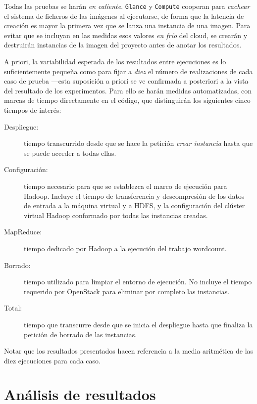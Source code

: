 Todas las pruebas se har\'an \emph{en caliente}. \texttt{Glance} y \texttt{Compute} cooperan para \emph{cachear} el sistema de ficheros de las im\'agenes al ejecutarse, de forma que la latencia de creaci\'on es mayor la primera vez que se lanza una instancia de una imagen. Para evitar que se incluyan en las medidas esos valores \emph{en fr\'io} del cloud, se crear\'an y destruir\'an instancias de la imagen del proyecto antes de anotar los resultados. \newline

A priori, la variabilidad esperada de los resultados entre ejecuciones es lo suficientemente peque\~na como para fijar a \emph{diez} el n\'umero de realizaciones de cada caso de prueba ---esta suposici\'on a priori se ve confirmada a posteriori a la vista del resultado de los experimentos. Para ello se har\'an medidas auto\-ma\-ti\-za\-das, con marcas de tiempo directamente en el c\'odigo, que distinguir\'an los siguientes cinco tiempos de inter\'es:

\begin{description}
    \item[Despliegue:] tiempo transcurrido desde que se hace la petici\'on \emph{crear ins\-tan\-cia} hasta que se puede acceder a todas ellas.
  \item[Configuraci\'on:] tiempo necesario para que se establezca el marco de ejecuci\'on para Hadoop. Incluye el tiempo de transferencia y descompresi\'on de los datos de entrada a la m\'aquina virtual y a HDFS, y la configuraci\'on del cl\'uster virtual Hadoop conformado por todas las instancias creadas.
  \item[MapReduce:] tiempo dedicado por Hadoop a la ejecuci\'on del trabajo wordcount.
  \item[Borrado:] tiempo utilizado para limpiar el entorno de ejecuci\'on. No incluye el tiempo requerido por OpenStack para eliminar por completo las ins\-tan\-cias.
  \item[Total:] tiempo que transcurre desde que se inicia el despliegue hasta que finaliza la petici\'on de borrado de las instancias.
\end{description}

Notar que los resultados presentados hacen referencia a la media aritm\'etica de las diez ejecuciones para cada caso. 


\section{An\'alisis de resultados}\label{sec:analisisresultados}

